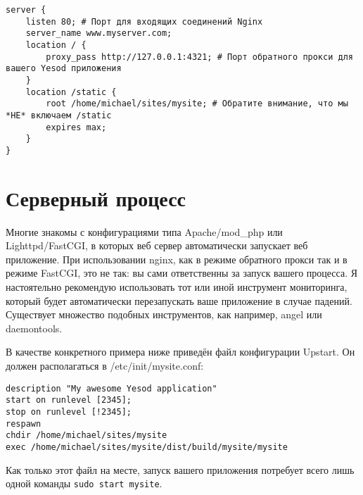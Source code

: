\begin{lstlisting}
server {
    listen 80; # Порт для входящих соединений Nginx
    server_name www.myserver.com;
    location / {
        proxy_pass http://127.0.0.1:4321; # Порт обратного прокси для вашего Yesod приложения
    }
    location /static {
        root /home/michael/sites/mysite; # Обратите внимание, что мы *НЕ* включаем /static
        expires max;
    }
}
\end{lstlisting}
%

\section{Серверный процесс}

%
%
Многие знакомы с конфигурациями типа Apache/mod\_php или Lighttpd/FastCGI, в которых веб сервер автоматически запускает веб приложение. При использовании nginx, как в режиме обратного прокси так и в режиме FastCGI, это не так: вы сами ответственны за запуск вашего процесса. Я настоятельно рекомендую использовать тот или иной инструмент мониторинга, который будет автоматически перезапускать ваше приложение в случае падений. Существует множество подобных инструментов, как например, angel или daemontools.

В качестве конкретного примера ниже приведён файл конфигурации Upstart. Он должен располагаться в /etc/init/mysite.conf:

\begin{lstlisting}
description "My awesome Yesod application"
start on runlevel [2345];
stop on runlevel [!2345];
respawn
chdir /home/michael/sites/mysite
exec /home/michael/sites/mysite/dist/build/mysite/mysite
\end{lstlisting}
%

Как только этот файл на месте, запуск вашего приложения потребует всего лишь одной команды \lstinline{sudo start mysite}.
%
